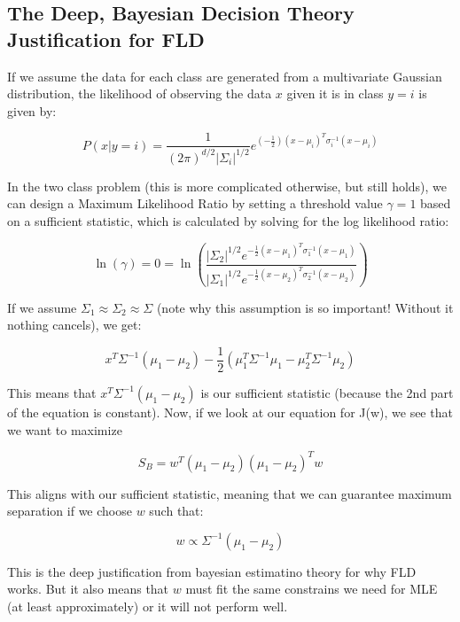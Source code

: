 \documentclass[12pt]{article}
\begin{document}
\subsection{The Deep, Bayesian Decision Theory Justification for FLD}

If we assume the data for each class are generated from a multivariate Gaussian distribution, the likelihood of observing the data \(x\) given it is in class \(y=i\) is given by:

\[P(x | y = i) = \frac{1}{(2\pi)^{d/2}|\Sigma_i|^{1/2}}e^{(-\frac{1}{2})(x - \mu_i)^T\sigma_i^{-1}(x - \mu_i)}\]

In the two class problem (this is more complicated otherwise, but still holds), we can design a Maximum Likelihood Ratio by setting a threshold value \(\gamma = 1\) based on a sufficient statistic, which is calculated by solving for the log likelihood ratio:

\[\ln(\gamma) = 0 = \ln\left(\frac{|\Sigma_2|^{1/2}e^{-\frac{1}{2}(x - \mu_1)^T\sigma_1^{-1}(x - \mu_1)}}{|\Sigma_1|^{1/2}e^{-\frac{1}{2}(x - \mu_2)^T\sigma_2^{-1}(x - \mu_2)}}\right)\]

If we assume \(\Sigma_1 \approx \Sigma_2 \approx \Sigma\) (note why this assumption is so important! Without it nothing cancels), we get:

\[x^T\Sigma^{-1}(\mu_1 - \mu_2) - \frac{1}{2}(\mu_1^T\Sigma^{-1}\mu_1 - \mu_2^T\Sigma^{-1}\mu_2)\]

This means that \(x^T\Sigma^{-1}(\mu_1 - \mu_2)\) is our sufficient statistic (because the 2nd part of the equation is constant). Now, if we look at our equation for J(w), we see that we want to maximize

\[S_B = w^T(\mu_1 - \mu_2)(\mu_1 - \mu_2)^Tw\]

This aligns with our sufficient statistic, meaning that we can guarantee maximum separation if we choose \(w\) such that:

\[w \propto \Sigma^{-1}(\mu_1 - \mu_2)\]

This is the deep justification from bayesian estimatino theory for why FLD works. But it also means that \(w\) must fit the same constrains we need for MLE (at least approximately) or it will not perform well. 
\end{document}
